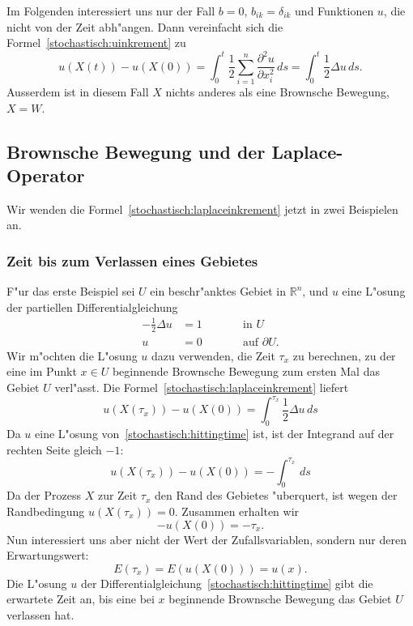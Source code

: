 Im Folgenden interessiert uns nur der Fall $b=0$, $b_{ik}=\delta_{ik}$
und Funktionen $u$, die nicht von der Zeit abh"angen.
Dann vereinfacht sich die Formel~\eqref{stochastisch:uinkrement} zu
\begin{equation}
u(X(t))-u(X(0))
=
\int_0^t \frac12\sum_{i=1}^n\frac{\partial^2 u}{\partial x_i^2}\,ds
=
\int_0^t \frac12\Delta u\,ds.
\label{stochastisch:laplaceinkrement}
\end{equation}
Ausserdem ist in diesem Fall $X$ nichts anderes als eine Brownsche Bewegung,
$X=W$.

\subsection{Brownsche Bewegung und der Laplace-Operator}
Wir wenden die Formel~\eqref{stochastisch:laplaceinkrement} jetzt in
zwei Beispielen an.

\subsubsection{Zeit bis zum Verlassen eines Gebietes}
F"ur das erste Beispiel sei $U$ ein beschr"anktes Gebiet in
$\mathbb R^n$, und $u$ eine L"osung der partiellen Differentialgleichung
\begin{equation}
\begin{aligned}
-\frac12\Delta u&=1&\qquad&\text{in $U$}\\
               u&=0&      &\text{auf $\partial U$.}
\end{aligned}
\label{stochastisch:hittingtime}
\end{equation}
Wir m"ochten die L"osung $u$ dazu verwenden, die Zeit $\tau_x$ zu berechnen,
zu der eine im Punkt $x\in U$ beginnende Brownsche Bewegung zum ersten
Mal das Gebiet $U$ verl"asst.
Die Formel~\eqref{stochastisch:laplaceinkrement} liefert
\[
u(X(\tau_x))-u(X(0)) = \int_0^{\tau_x} \frac12\Delta u\,ds
\]
Da $u$ eine L"osung von~\eqref{stochastisch:hittingtime} ist, ist der 
Integrand auf der rechten Seite gleich $-1$:
\[
u(X(\tau_x))-u(X(0)) = -\int_0^{\tau_x} \,ds
\]
Da der Prozess $X$ zur Zeit $\tau_x$ den Rand des Gebietes "uberquert,
ist wegen der Randbedingung $u(X(\tau_x))=0$. 
Zusammen erhalten wir
\[
-u(X(0)) = -\tau_x.
\]
Nun interessiert uns aber nicht der Wert der Zufallsvariablen, sondern
nur deren Erwartungswert:
\[
E(\tau_x)=E(u(X(0)))=u(x).
\]
Die L"osung $u$ der Differentialgleichung~\eqref{stochastisch:hittingtime}
gibt die erwartete Zeit an, bis eine bei $x$ beginnende Brownsche Bewegung 
das Gebiet $U$ verlassen hat.

